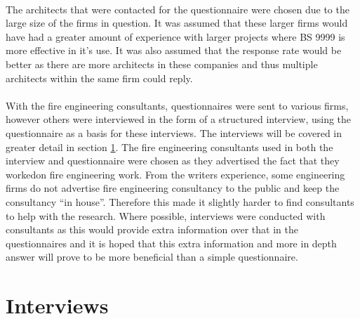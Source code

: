 \documentclass[a4paper,oneside]{book}
\begin{document}
\\
The architects that were contacted for the questionnaire were chosen due to the large size of the firms in question. It was assumed that these larger firms would have had a greater amount of experience with larger projects where BS 9999 is more effective in it's use. It was also assumed that the response rate would be better as there are more architects in these companies and thus multiple architects within the same firm could reply.
\\
\\
With the fire engineering consultants, questionnaires were sent to various firms, however others were interviewed in the form of a structured interview, using the questionnaire as a basis for these interviews. The interviews will be covered in greater detail in section \ref{sec:Interviews}. The fire engineering consultants used in both the interview and questionnaire were chosen as they advertised the fact that they workedon fire engineering work. From the writers experience, some engineering firms do not advertise fire engineering consultancy to the public and keep the consultancy ``in house''. Therefore this made it slightly harder to find consultants to help with the research. Where possible, interviews were conducted with consultants as this would provide extra information over that in the questionnaires and it is hoped that this extra information and more in depth answer will prove to be more beneficial than a simple questionnaire.
\\
\section{Interviews}
\label{sec:Interviews}
\end{document}
